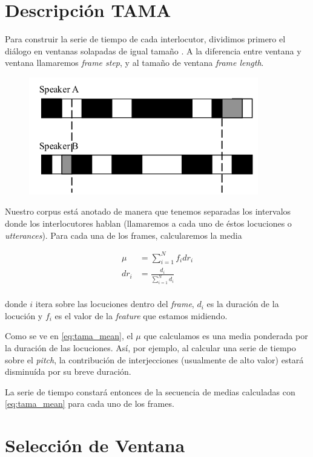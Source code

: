 \section{Descripción TAMA}

Para construir la serie de tiempo de cada interlocutor, dividimos primero el diálogo en ventanas solapadas de igual tamaño \cite{KOU2008}. A la diferencia entre ventana y ventana llamaremos \emph{frame step}, y al tamaño de ventana \emph{frame length}.

\begin{figure}
\centering
\includegraphics[width=10cm]{images/tama.png}
\end{figure}

Nuestro corpus está anotado de manera que tenemos separadas los intervalos donde los interlocutores hablan (llamaremos a cada uno de éstos locuciones o \emph{utterances}). Para cada una de los frames, calcularemos la media

\begin{align}
    \mu &= \sum\limits_{i=1}^N f_i dr_i \label{eq:tama_mean}\\
    dr_i &= \frac{d_i}{\sum\limits_{i=1}^N d_i} \\
\end{align}

donde $i$ itera sobre las locuciones dentro del \emph{frame}, $d_i$ es la duración de la locución y $f_i$ es el valor de la \emph{feature} que estamos midiendo.

Como se ve en \ref{eq:tama_mean}, el $\mu$ que calculamos es una media ponderada por la duración de las locuciones. Así, por ejemplo, al calcular una serie de tiempo sobre el \emph{pitch}, la contribución de interjecciones (usualmente de alto valor) estará disminuída por su breve duración.

La serie de tiempo constará entonces de la secuencia de medias calculadas con \ref{eq:tama_mean} para cada uno de los frames.


\section{Selección de Ventana}

